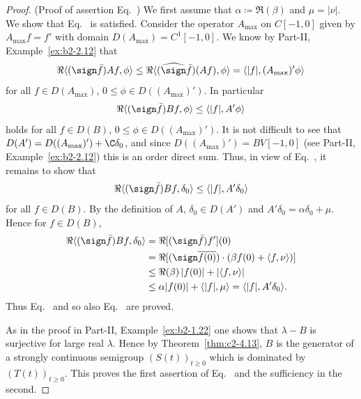 \begin{proof}(Proof of assertion Eq.~)
We first assume that $\alpha \coloneqq \Re(\beta)$ and $\mu = |\nu|$.
We show that Eq.~ is satisfied.
Consider the operator $A_{\max}$ on $C[-1,0]$ given by $A_{\max}f = f'$ with domain $D(A_{\max}) = C^{1}[-1,0]$.
We know by Part-II, Example~\ref{ex:b2-2.12} 
that 
\[
\Re\langle(\sign  \bar{f})Af,\phi\rangle \leq \Re\langle(\widehat{\sign}  \bar{f})(Af),\phi\rangle = \langle|f|, (A_{\max})'\phi\rangle
\]
for all $f \in D(A_{\max})$, $0 \leq \phi \in D((A_{\max})')$.
In particular
\begin{equation}\label{eq:c2-4.14}
\Re\langle(\sign  \bar{f})Bf,\phi\rangle \leq \langle|f|,A'\phi\rangle
\end{equation}
holds for all $f \in D(B)$, $0 \leq \phi \in D((A_{\max})')$.
It is not difficult to see that $D(A') = D((A_{\max})') + \C\delta_{0}$, and since $D((A_{\max})') = BV[-1,0]$
(see Part-II, Example~\ref{ex:b2-2.12})
this is an order direct sum.
Thus, in view of Eq.~, it remains to show that
\begin{equation}\label{eq:c2-4.15}
\Re\langle(\sign  \bar{f})Bf,\delta_{0}\rangle \leq \langle|f|,A'\delta_{0}\rangle
\end{equation}
for all $f \in D(B)$.
By the definition of\/ $A$, $\delta_{0} \in D(A')$ and $A'\delta_{0} =  \alpha\delta_{0} + \mu$.
Hence for $f \in D(B)$,
\begin{align*}
\Re\langle(\sign \bar{f})Bf,\delta_{0}\rangle &= \Re[(\sign \bar{f})f'](0) \\
&= \Re[(\sign  \overline{f(0)})\cdot(\beta f(0) +  \langle f,\nu\rangle)] \\
&\leq \Re(\beta) \, |f(0)| + |\langle f,\nu\rangle| \\
&\leq \alpha|f(0)| + \langle|f|,\mu\rangle = \langle|f|,A'\delta_{0}\rangle.
\end{align*}
Thus Eq.~ and so also Eq.~ are proved.

As in the proof in  Part-II, Example~\ref{ex:b2-1.22} one shows that $\lambda - B$ is surjective for large real $\lambda$.
Hence by Theorem~\ref{thm:c2-4.13}, $B$ is the generator of a
strongly continuous semigroup $(S(t))_{t \geq 0}$ which is dominated by
$(T(t))_{t \geq 0}$.
This proves the first assertion of Eq.~ and the sufficiency in the second.


\end{proof}
